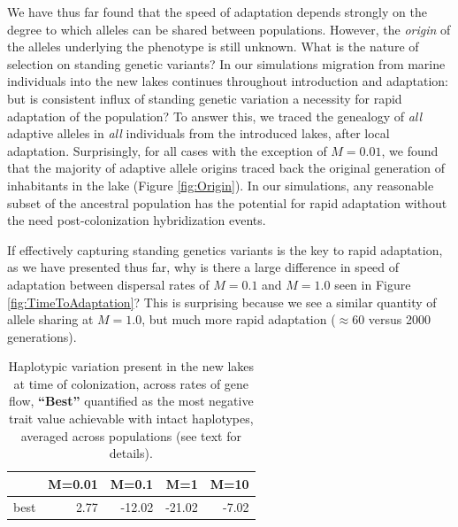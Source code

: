 \documentclass{article}
\begin{document}
We have thus far found that the speed of adaptation depends strongly on the degree to which alleles can be shared between populations. 
However, the \textit{origin} of the alleles underlying the phenotype is still unknown. 
What is the nature of selection on standing genetic variants? 
In our simulations migration from marine individuals into the new lakes continues throughout introduction and adaptation: but is consistent influx of standing genetic variation a necessity for rapid adaptation of the population?
To answer this, we traced the genealogy of \textit{all} adaptive alleles in \textit{all} individuals from the introduced lakes, after local adaptation.
Surprisingly, for all cases with the exception of $M = 0.01$, we found that the majority of adaptive allele origins traced back the original generation of inhabitants in the lake (Figure \ref{fig:Origin}). 
In our simulations,
any reasonable subset of the ancestral population has the potential for rapid adaptation without the need post-colonization hybridization events.

If effectively capturing standing genetics variants is the key to rapid adaptation, as we have presented thus far, why is there a large difference in speed of adaptation between dispersal rates of $M = 0.1$ and $M = 1.0$ seen in Figure \ref{fig:TimeToAdaptation}?
This is surprising because we see a similar quantity of allele sharing at  $M = 1.0$, but much more rapid adaptation ($\approx 60$ versus 2000 generations).

\begin{table}[ht]
    \centering
    \begin{tabular}{rrrrr}
      \hline
     & M=0.01 & M=0.1 & M=1 & M=10 \\ 
      \hline
          best & 2.77 & -12.02 & -21.02 & -7.02 \\ 
       \hline
    \end{tabular}
    \caption{
        Haplotypic variation present in the new lakes at time of colonization,
        across rates of gene flow,
        \textbf{``Best''} 
        quantified as the most negative trait value achievable
        with intact haplotypes, averaged across populations
        (see text for details).
    } \label{tab:linkage}
\end{table}
\end{document}
